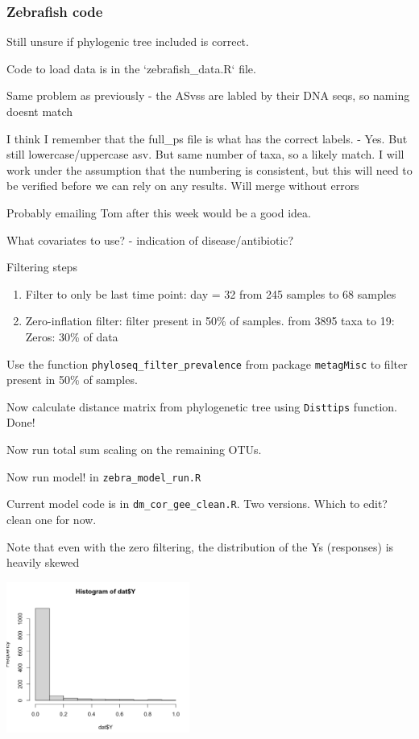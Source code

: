 \documentclass[10pt]{article}
\begin{document}
\subsubsection*{Zebrafish code}

Still unsure if phylogenic tree included is correct.

Code to load data is in the `zebrafish\_data.R` file.

Same problem as previously - the ASvss are labled by their DNA seqs, so naming doesnt match

I think I remember that the full\_ps file is what has the correct labels. - Yes. But still lowercase/uppercase asv. But same number of taxa, so a likely match. I will work under the assumption that the numbering is consistent, but this will need to be verified before we can rely on any results. Will merge without errors

Probably emailing Tom after this week would be a good idea.

What covariates to use? - indication of disease/antibiotic?

Filtering steps
\begin{enumerate}
  \item Filter to only be last time point: day = 32 from 245 samples to 68 samples
  \item Zero-inflation filter: filter present in 50\% of samples.  from 3895 taxa to 19: Zeros: 30\% of data
\end{enumerate}

Use the function \texttt{phyloseq\_filter\_prevalence} from package \texttt{metagMisc} to filter present in 50\% of samples.

Now calculate distance matrix from phylogenetic tree using \texttt{Disttips} function. Done!


Now run total sum scaling on the remaining OTUs.

Now run model! in \texttt{zebra\_model\_run.R}

Current model code is in \texttt{dm\_cor\_gee\_clean.R}. Two versions. Which to edit? clean one for now.

Note that even with the zero filtering, the distribution of the Ys (responses) is heavily skewed

\includegraphics[width=0.45\textwidth]{img/Progress_Report-ce0570ff.png}
\end{document}
